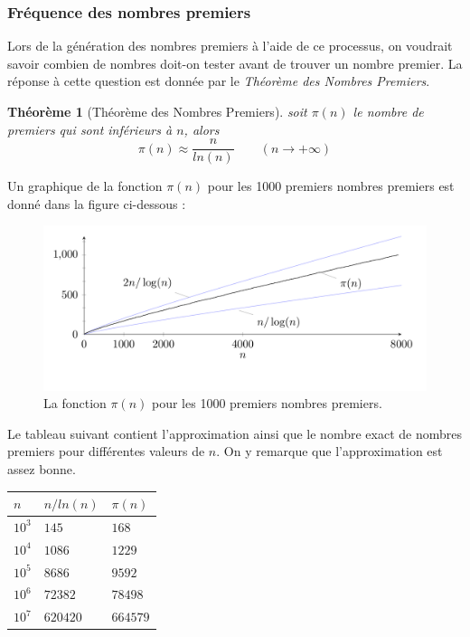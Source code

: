 		\subsubsection*{Fréquence des nombres premiers}
		Lors de la génération des nombres premiers à l'aide de ce processus, on voudrait savoir combien de nombres doit-on tester avant de trouver un nombre premier. La réponse à cette question est donnée par le \textit{Théorème des Nombres Premiers}.
			\newtheorem{Th}{Théorème}
			\vspace{-1.5em}\begin{adjustwidth}{1.5cm}{1.5cm} 
			\begin{Th}[Théorème des Nombres Premiers]
				soit $\pi(n)$ le nombre de premiers qui sont inférieurs à $n$, alors
				\[\pi(n) \approx \frac{n}{ln(n)} \quad \quad (n \to +\infty)\]
			\end{Th}
			\end{adjustwidth}\vspace{0.5em}
		Un graphique de la fonction $\pi(n)$ pour les 1000 premiers nombres premiers est donné dans la figure ci-dessous :
		\begin{figure}[H]
			\begin{center}\includegraphics[scale=0.4]{freqPremiers.png}\end{center}\vspace{-3em}
			\caption{La fonction $\pi(n)$ pour les 1000 premiers nombres premiers.}\label{fig:M3}
		\end{figure}
		
		Le tableau suivant contient l'approximation ainsi que le nombre exact de nombres premiers pour différentes valeurs de $n$. On y remarque que l'approximation est assez bonne.
		\begin{table}[H]\begin{center}
			\begin{tabular}{|lll|}
			\hline
			$n$  & $n/ln(n)$ & $\pi(n)$     \\ \hline
			$10^{3}$ & $145$     & $168$     \\
			$10^{4}$ & $1 086$   & $1 229$   \\
			$10^{5}$ & $8 686$   & $9 592$   \\
			$10^{6}$ & $72 382$  & $78 498$  \\
			$10^{7}$ & $620 420$ & $664 579$ \\ \hline
			\end{tabular}
		\end{center}\end{table}
		
